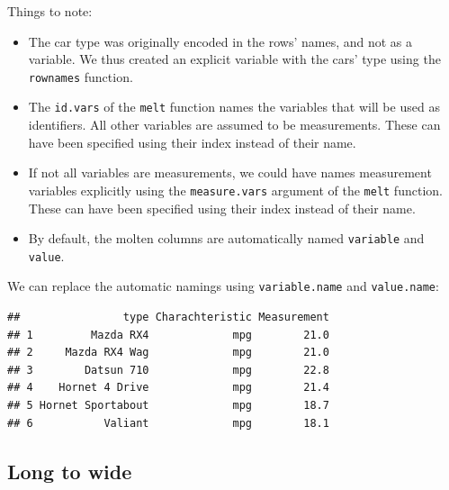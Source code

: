 \documentclass[]{book}
\newenvironment{Shaded}{\begin{snugshade}}{\end{snugshade}}
\newcommand{\DataTypeTok}[1]{\textcolor[rgb]{0.13,0.29,0.53}{#1}}
\newcommand{\KeywordTok}[1]{\textcolor[rgb]{0.13,0.29,0.53}{\textbf{#1}}}
\newcommand{\NormalTok}[1]{#1}
\newcommand{\OperatorTok}[1]{\textcolor[rgb]{0.81,0.36,0.00}{\textbf{#1}}}
\newcommand{\StringTok}[1]{\textcolor[rgb]{0.31,0.60,0.02}{#1}}
\providecommand{\tightlist}{%
  \setlength{\itemsep}{0pt}\setlength{\parskip}{0pt}}
\theoremstyle{definition}
\theoremstyle{definition}
\theoremstyle{definition}
\theoremstyle{remark}
\begin{document}
Things to note:

\begin{itemize}
\tightlist
\item
  The car type was originally encoded in the rows' names, and not as a variable. We thus created an explicit variable with the cars' type using the \texttt{rownames} function.
\item
  The \texttt{id.vars} of the \texttt{melt} function names the variables that will be used as identifiers. All other variables are assumed to be measurements. These can have been specified using their index instead of their name.
\item
  If not all variables are measurements, we could have names measurement variables explicitly using the \texttt{measure.vars} argument of the \texttt{melt} function. These can have been specified using their index instead of their name.
\item
  By default, the molten columns are automatically named \texttt{variable} and \texttt{value}.
\end{itemize}

We can replace the automatic namings using \texttt{variable.name} and \texttt{value.name}:

\begin{Shaded}
\end{Shaded}

\begin{verbatim}
##                type Charachteristic Measurement
## 1         Mazda RX4             mpg        21.0
## 2     Mazda RX4 Wag             mpg        21.0
## 3        Datsun 710             mpg        22.8
## 4    Hornet 4 Drive             mpg        21.4
## 5 Hornet Sportabout             mpg        18.7
## 6           Valiant             mpg        18.1
\end{verbatim}

\hypertarget{long-to-wide}{%
\subsection{Long to wide}\label{long-to-wide}}
\end{document}
